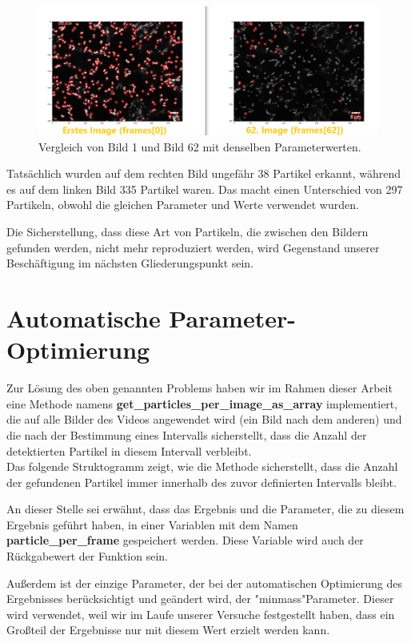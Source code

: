 \begin{figure}[H]
    \centering
    \includegraphics[scale=0.37]{Grafiken/trackpyBilder/comparison_0_Vs_62.png}
    \caption{Vergleich von Bild 1 und Bild 62 mit denselben Parameterwerten.}
    \label{fig:kap3_comp_Bild_1vs_62}
\end{figure}

Tatsächlich wurden auf dem rechten Bild ungefähr 38 Partikel erkannt, während es auf dem linken Bild 335 Partikel waren. Das macht einen Unterschied von 297 Partikeln, obwohl die gleichen Parameter und Werte verwendet wurden.

Die Sicherstellung, dass diese Art von Partikeln, die zwischen den Bildern gefunden werden, nicht mehr reproduziert werden, wird Gegenstand unserer Beschäftigung im nächsten Gliederungspunkt sein.

\section{Automatische Parameter-Optimierung}
Zur Lösung des oben genannten Problems haben wir im Rahmen dieser Arbeit eine Methode namens \textbf{get\_particles\_per\_image\_as\_array} implementiert, die auf alle Bilder des Videos angewendet wird (ein Bild nach dem anderen) und die nach der Bestimmung eines Intervalls sicherstellt, dass die Anzahl der detektierten Partikel in diesem Intervall verbleibt.\\

Das folgende Struktogramm zeigt, wie die Methode sicherstellt, dass die Anzahl der gefundenen Partikel immer innerhalb des zuvor definierten Intervalls bleibt.

An dieser Stelle sei erwähnt, dass das Ergebnis und die Parameter, die zu diesem Ergebnis geführt haben, in einer Variablen mit dem Namen \textbf{particle\_per\_frame} gespeichert werden.  Diese Variable wird auch der Rückgabewert der Funktion sein. 

Außerdem ist der einzige Parameter, der bei der automatischen Optimierung des Ergebnisses berücksichtigt und geändert wird, der "minmass"\-Parameter. Dieser wird verwendet, weil wir im Laufe unserer Versuche festgestellt haben, dass ein Großteil der Ergebnisse nur mit diesem Wert erzielt werden kann.


